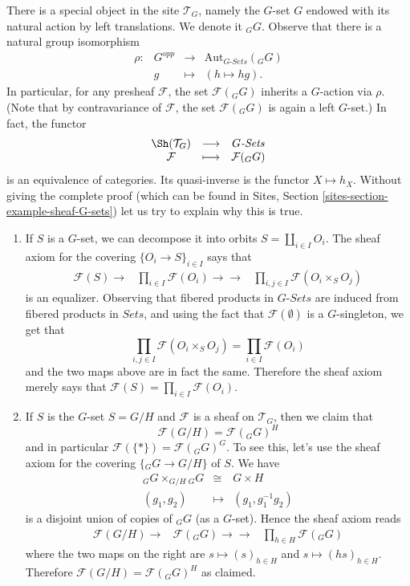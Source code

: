 \medskip\noindent
There is a special object in the site $\mathcal{T}_G$, namely the $G$-set $G$
endowed with its natural action by left translations. We denote it ${}_G G$.
Observe that there is a natural group isomorphism
$$
\begin{matrix}
\rho : & G^{opp} & \longrightarrow & \text{Aut}_{G\textit{-Sets}}({}_G G) \\
& g & \longmapsto & (h \mapsto hg).
\end{matrix}
$$
In particular, for any presheaf $\mathcal{F}$, the set $\mathcal{F}({}_G G)$
inherits a $G$-action via $\rho$. (Note that by contravariance of
$\mathcal{F}$, the set $\mathcal{F}({}_G G)$ is again a left $G$-set.) In fact,
the functor
$$
\begin{matrix}
\Sh(\mathcal{T}_G) & \longrightarrow & G\textit{-Sets} \\
\mathcal{F} & \longmapsto & \mathcal{F}({}_G G)
\end{matrix}
$$
is an equivalence of categories. Its quasi-inverse is the functor $X \mapsto
h_X$. Without giving the complete proof (which can be found in
Sites, Section \ref{sites-section-example-sheaf-G-sets})
let us try to explain why this is true.
\begin{enumerate}
\item
If $S$ is a $G$-set, we can decompose it into orbits $S = \coprod_{i\in I}
O_i$. The sheaf axiom for the covering $\{O_i \to S\}_{i\in I}$ says that
$$
\begin{array}{ccc}\mathcal{F}(S) \longrightarrow & \prod_{i\in I} \mathcal{F}(O_i) \longrightarrow\longrightarrow & \prod_{i, j \in I} \mathcal{F}(O_i \times_S O_j)\end{array}
$$
is an equalizer. Observing that fibered products in $G\textit{-Sets}$ are
induced from fibered products in $\textit{Sets}$, and using the fact that
$\mathcal{F}(\emptyset)$ is a $G$-singleton, we get that
$$
\prod_{i, j \in I} \mathcal{F}(O_i \times_S O_j) = \prod_{i \in I}
\mathcal{F}(O_i)
$$
and the two maps above are in fact the same. Therefore the sheaf axiom merely
says that $\mathcal{F}(S) = \prod_{i\in I} \mathcal{F}(O_i)$.
\item
If $S$ is the $G$-set $S= G/H$ and $\mathcal{F}$ is a sheaf on $\mathcal{T}_G$,
then we claim that
$$
\mathcal{F}(G/H) = \mathcal{F}({}_G G)^H
$$
and in particular $\mathcal{F}(\{*\}) = \mathcal{F}({}_G G)^G$. To see this,
let's use the sheaf axiom for the covering $\{ {}_G G \to G/H \}$ of $S$. We
have
\begin{eqnarray*}
{}_G G \times_{G/H} {}_G G & \cong & G \times H \\
(g_1, g_2) & \longmapsto & (g_1, g_1^{-1} g_2)
\end{eqnarray*}
is a disjoint union of copies of ${}_G G$ (as a $G$-set). Hence the sheaf axiom
reads
$$
\begin{array}{ccc}\mathcal{F} (G/H) \longrightarrow & \mathcal{F}({}_G G) \longrightarrow\longrightarrow & \prod_{h\in H} \mathcal{F}({}_G G)\end{array}
$$
where the two maps on the right are $s \mapsto (s)_{h \in H}$ and $s \mapsto
(hs)_{h \in H}$. Therefore $\mathcal{F}(G/H) = \mathcal{F}({}_G G)^H$ as
claimed.
\end{enumerate}
